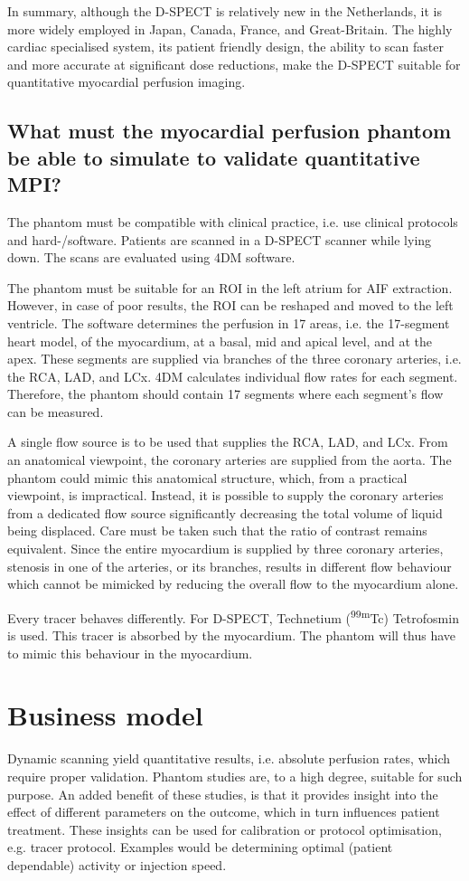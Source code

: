 In summary, although the D-SPECT is relatively new in the Netherlands, it is more widely employed in Japan, Canada, France, and Great-Britain. The highly cardiac specialised system, its patient friendly design, the ability to scan faster and more accurate at significant dose reductions, make the D-SPECT suitable for quantitative myocardial perfusion imaging. 

\subsection{What must the myocardial perfusion phantom be able to simulate to validate quantitative MPI?}
\label{sec:what_perf}
The phantom must be compatible with clinical practice, i.e. use clinical protocols and hard-/software. Patients are scanned in a D-SPECT scanner while lying down. The scans are evaluated using 4DM software. 

The phantom must be suitable for an ROI in the left atrium for \ac{AIF} extraction. However, in case of poor results, the ROI can be reshaped and moved to the left ventricle. The software determines the perfusion in 17 areas, i.e. the 17-segment heart model, of the myocardium, at a basal, mid and apical level, and at the apex. These segments are supplied via branches of the three coronary arteries, i.e. the RCA, LAD, and LCx. 4DM calculates individual flow rates for each segment. Therefore, the phantom should contain 17 segments where each segment's flow can be measured. 

A single flow source is to be used that supplies the RCA, LAD, and LCx. From an anatomical viewpoint, the coronary arteries are supplied from the aorta. The phantom could mimic this anatomical structure, which, from a practical viewpoint, is impractical. Instead, it is possible to supply the coronary arteries from a dedicated flow source significantly decreasing the total volume of liquid being displaced. Care must be taken such that the ratio of contrast remains equivalent. Since the entire myocardium is supplied by three coronary arteries, stenosis in one of the arteries, or its branches, results in different flow behaviour which cannot be mimicked by reducing the overall flow to the myocardium alone.

Every tracer behaves differently. For D-SPECT, Technetium (\textsuperscript{99m}Tc) Tetrofosmin is used. This tracer is absorbed by the myocardium. The phantom will thus have to mimic this behaviour in the myocardium.

\section{Business model}
Dynamic scanning yield quantitative results, i.e. absolute perfusion rates, which require proper validation. Phantom studies are, to a high degree, suitable for such purpose. An added benefit of these studies, is that it provides insight into the effect of different parameters on the outcome, which in turn influences patient treatment. These insights can be used for calibration or protocol optimisation, e.g. tracer protocol. Examples would be determining optimal (patient dependable) activity or injection speed.

